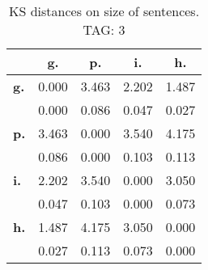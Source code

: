 \begin{table}[h!]
\begin{center}
\begin{tabular}{| l || c | c | c | c |}\hline
 & {\bf g.} & {\bf p.} & {\bf i.} & {\bf h.} \\\hline\hline
{\bf g.} & 0.000 & 3.463 & 2.202 & 1.487 \\
{\bf } & 0.000 & 0.086 & 0.047 & 0.027 \\\hline
{\bf p.} & 3.463 & 0.000 & 3.540 & 4.175 \\
{\bf } & 0.086 & 0.000 & 0.103 & 0.113 \\\hline
{\bf i.} & 2.202 & 3.540 & 0.000 & 3.050 \\
{\bf } & 0.047 & 0.103 & 0.000 & 0.073 \\\hline
{\bf h.} & 1.487 & 4.175 & 3.050 & 0.000 \\
{\bf } & 0.027 & 0.113 & 0.073 & 0.000 \\\hline
\end{tabular}
\caption{KS distances on size of sentences. TAG: 3}
\end{center}
\end{table}